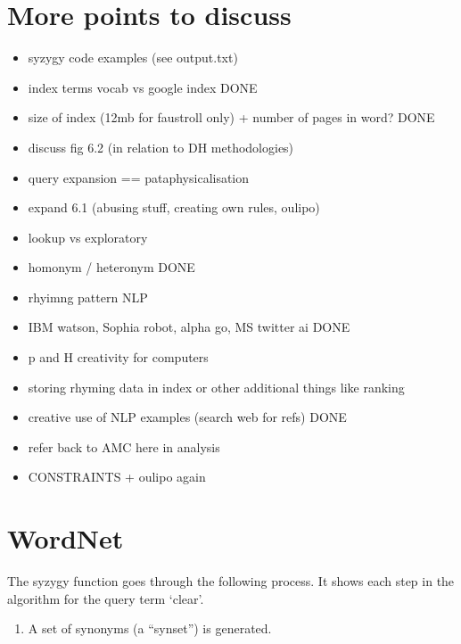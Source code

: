 \section*{More points to discuss}


\begin{itemize}
  \item syzygy code examples (see output.txt)
  \item index terms vocab vs google index DONE
  \item size of index (12mb for faustroll only) + number of pages in word? DONE
  \item discuss fig 6.2 (in relation to DH methodologies)
  \item query expansion == pataphysicalisation
  \item expand 6.1 (abusing stuff, creating own rules, oulipo)
  \item lookup vs exploratory
  \item homonym / heteronym DONE
  \item rhyimng pattern NLP
  \item IBM watson, Sophia robot, alpha go, MS twitter ai DONE
  \item p and H creativity for computers
  \item storing rhyming data in index or other additional things like ranking
  \item creative use of NLP examples (search web for refs) DONE
  \item refer back to AMC here in analysis
  \item CONSTRAINTS + oulipo again
\end{itemize}


\section{WordNet}

The syzygy function goes through the following process.
It shows each step in the algorithm for the query term `clear'.
\begin{enumerate}
  \item A set of synonyms (a ``synset'') is generated.
\end{enumerate}

